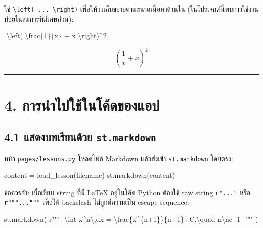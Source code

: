 \documentclass[
  thai,
  12pt,
  letterpaper,
  DIV=11,
  numbers=noendperiod]{scrartcl}
\newenvironment{Shaded}{\begin{snugshade}}{\end{snugshade}}
\newcommand{\CharTok}[1]{\textcolor[rgb]{0.13,0.47,0.30}{#1}}
\newcommand{\DecValTok}[1]{\textcolor[rgb]{0.68,0.00,0.00}{#1}}
\newcommand{\ErrorTok}[1]{\textcolor[rgb]{0.68,0.00,0.00}{#1}}
\newcommand{\NormalTok}[1]{\textcolor[rgb]{0.00,0.23,0.31}{#1}}
\newcommand{\OperatorTok}[1]{\textcolor[rgb]{0.37,0.37,0.37}{#1}}
\newcommand{\VerbatimStringTok}[1]{\textcolor[rgb]{0.13,0.47,0.30}{#1}}
\begin{document}
ใช้ \texttt{\textbackslash{}left(\ ...\ \textbackslash{}right)}
เพื่อให้วงเล็บขยายตามขนาดเนื้อหาด้านใน
(ในโปรเจกต์นี้พบการใช้งานบ่อยในสมการที่มีเศษส่วน):

\begin{Shaded}
\begin{Highlighting}[]
\NormalTok{$$}
\NormalTok{\textbackslash{}left( \textbackslash{}frac\{1\}\{x\} + x \textbackslash{}right)\^{}2}
\NormalTok{$$}
\end{Highlighting}
\end{Shaded}

\[
\left( \frac{1}{x} + x \right)^2
\]

\begin{center}\rule{0.5\linewidth}{0.5pt}\end{center}

\section{4.
การนำไปใช้ในโค้ดของแอป}\label{uxe01uxe32uxe23uxe19uxe33uxe44uxe1buxe43uxe0auxe43uxe19uxe42uxe04uxe14uxe02uxe2duxe07uxe41uxe2duxe1b}

\subsection{\texorpdfstring{4.1 แสดงบทเรียนด้วย
\texttt{st.markdown}}{4.1 แสดงบทเรียนด้วย st.markdown}}\label{uxe41uxe2auxe14uxe07uxe1auxe17uxe40uxe23uxe22uxe19uxe14uxe27uxe22-st.markdown}

หน้า \texttt{pages/lessons.py} โหลดไฟล์ Markdown แล้วส่งเข้า
\texttt{st.markdown} โดยตรง:

\begin{Shaded}
\begin{Highlighting}[]
\NormalTok{content }\OperatorTok{=}\NormalTok{ load\_lesson(filename)}
\NormalTok{st.markdown(content)}
\end{Highlighting}
\end{Shaded}

ข้อควรจำ: เมื่อเขียน string ที่มี LaTeX อยู่ในโค้ด Python ต้องใช้ raw string
\texttt{r"..."} หรือ \texttt{r"""..."""} เพื่อให้ backslash ไม่ถูกตีความเป็น
escape sequence:

\begin{Shaded}
\begin{Highlighting}[]
\NormalTok{st.markdown(}
    \VerbatimStringTok{r"""}
\DecValTok{$$}
\ErrorTok{\textbackslash{}}\VerbatimStringTok{int x}\DecValTok{\^{}}\VerbatimStringTok{n}\CharTok{\textbackslash{},}\VerbatimStringTok{dx = }\CharTok{\textbackslash{}f}\VerbatimStringTok{rac\{x}\DecValTok{\^{}}\VerbatimStringTok{\{n}\OperatorTok{+}\VerbatimStringTok{1\}\}\{n}\OperatorTok{+}\VerbatimStringTok{1\}}\OperatorTok{+}\VerbatimStringTok{C,}\ErrorTok{\textbackslash{}}\VerbatimStringTok{quad n}\CharTok{\textbackslash{}n}\VerbatimStringTok{e {-}1}
\DecValTok{$$}
\VerbatimStringTok{"""}
\NormalTok{)}
\end{Highlighting}
\end{Shaded}
\end{document}
